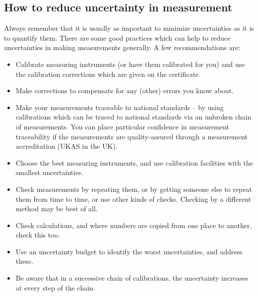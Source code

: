 \subsection{How to reduce uncertainty in measurement}
Always remember that it is usually as important to minimize uncertainties as it is to quantify them. There are some good practices which can help to reduce uncertainties in making measurements generally. A few recommendations are:
\begin{itemize}
\item Calibrate measuring instruments (or have them calibrated for you) and use the calibration corrections which are given on the certificate.
%
\item Make corrections to compensate for any (other) errors you know about.
%
\item Make your measurements traceable to national standards -- by using calibrations which can be traced to national standards via an unbroken chain of measurements. You can place particular confidence in measurement traceability if the measurements are quality-assured through a measurement accreditation (UKAS in the UK).
%
\item Choose the best measuring instruments, and use calibration facilities with the smallest uncertainties.
%
\item Check measurements by repeating them, or by getting someone else to repeat them from time to time, or use other kinds of checks. Checking by a different method may be best of all.
%
\item Check calculations, and where numbers are copied from one place to another, check this too.
%
\item Use an uncertainty budget to identify the worst uncertainties, and address these.
%
\item Be aware that in a successive chain of calibrations, the uncertainty increases at every step of the chain.
%
\end{itemize}


